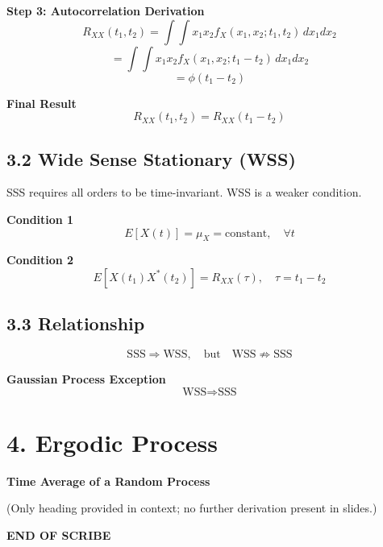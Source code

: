 \documentclass[12pt]{article}
\begin{document}
\textbf{Step 3: Autocorrelation Derivation}
\[
R_{XX}(t_1,t_2)
= \int\int x_1 x_2 f_X(x_1,x_2;t_1,t_2)\,dx_1dx_2
\]
\[
= \int\int x_1 x_2 f_X(x_1,x_2;t_1-t_2)\,dx_1dx_2
\]
\[
= \phi(t_1 - t_2)
\]

\textbf{Final Result}
\[
R_{XX}(t_1,t_2) = R_{XX}(t_1 - t_2)
\]

\subsection*{3.2 Wide Sense Stationary (WSS)}

SSS requires all orders to be time-invariant.  
WSS is a weaker condition.

\textbf{Condition 1}
\[
E[X(t)] = \mu_X = \text{constant}, \quad \forall t
\]

\textbf{Condition 2}
\[
E[X(t_1)X^*(t_2)] = R_{XX}(\tau), \quad \tau = t_1 - t_2
\]

\subsection*{3.3 Relationship}
\[
\text{SSS} \Rightarrow \text{WSS}, \quad \text{but} \quad \text{WSS} \not\Rightarrow \text{SSS}
\]

\textbf{Gaussian Process Exception}
\[
\text{WSS} \Rightarrow \text{SSS}
\]

\section*{4. Ergodic Process}

\textbf{Time Average of a Random Process}

(Only heading provided in context; no further derivation present in slides.)

\bigskip
\textbf{END OF SCRIBE}
\end{document}
